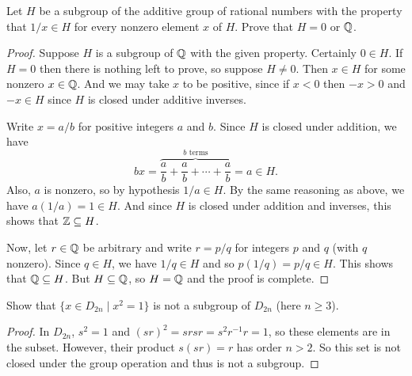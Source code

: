  Let $H$ be a subgroup of the additive group of rational
numbers with the property that $1/x\in H$ for every nonzero element
$x$ of $H$. Prove that $H = 0$ or $\mathbb{Q}$.
\begin{proof}
  Suppose $H$ is a subgroup of $\mathbb{Q}$ with the given property. Certainly
  $0\in H$. If $H = 0$ then there is nothing left to prove, so suppose
  $H\neq0$. Then $x\in H$ for some nonzero $x\in\mathbb{Q}$. And we may take
  $x$ to be positive, since if $x < 0$ then $-x > 0$ and $-x\in H$
  since $H$ is closed under additive inverses.

  Write $x = a/b$ for positive integers $a$ and $b$. Since $H$ is
  closed under addition, we have
  \begin{equation*}
    bx = \overbrace{\frac{a}b + \frac{a}b
      + \cdots + \frac{a}b}^{\text{$b$ terms}} = a\in H.
  \end{equation*}
  Also, $a$ is nonzero, so by hypothesis $1/a\in H$. By the same
  reasoning as above, we have $a(1/a) = 1\in H$. And since $H$ is
  closed under addition and inverses, this shows that $\mathbb{Z}\subseteq H$.

  Now, let $r\in\mathbb{Q}$ be arbitrary and write $r = p/q$ for integers $p$
  and $q$ (with $q$ nonzero). Since $q\in H$, we have $1/q\in H$ and
  so $p(1/q) = p/q\in H$. This shows that $\mathbb{Q}\subseteq H$. But
  $H\subseteq\mathbb{Q}$, so $H = \mathbb{Q}$ and the proof is complete.
\end{proof}

 Show that $\{x\in D_{2n} \mid x^2 = 1\}$ is not a
subgroup of $D_{2n}$ (here $n\geq3$).
\begin{proof}
  In $D_{2n}$, $s^2 = 1$ and $(sr)^2 = srsr = s^2r^{-1}r = 1$, so
  these elements are in the subset. However, their product $s(sr) = r$
  has order $n>2$. So this set is not closed under the group operation
  and thus is not a subgroup.
\end{proof}
